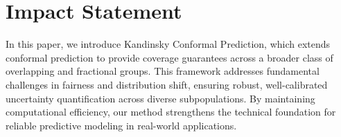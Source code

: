 \documentclass{article}
\newif\ifarxiv
\begin{document}








\clearpage

\ifarxiv
\else
\section*{Impact Statement}
In this paper, we introduce Kandinsky Conformal Prediction, which extends conformal prediction to provide coverage guarantees across a broader class of overlapping and fractional groups. This framework addresses fundamental challenges in fairness and distribution shift, ensuring robust, well-calibrated uncertainty quantification across diverse subpopulations. By maintaining computational efficiency, our method strengthens the technical foundation for reliable predictive modeling in real-world applications.
\fi




\newpage
\appendix


\end{document}
